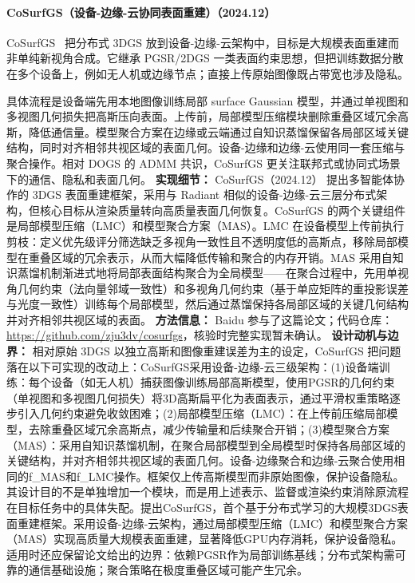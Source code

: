 \paragraph{CoSurfGS（设备-边缘-云协同表面重建）（2024.12）}
CoSurfGS~\cite{2412_17612} 把分布式 3DGS 放到设备-边缘-云架构中，目标是大规模表面重建而非单纯新视角合成。它继承 PGSR/2DGS 一类表面约束思想，但把训练数据分散在多个设备上，例如无人机或边缘节点；直接上传原始图像既占带宽也涉及隐私。

具体流程是设备端先用本地图像训练局部 surface Gaussian 模型，并通过单视图和多视图几何损失把高斯压向表面。上传前，局部模型压缩模块删除重叠区域冗余高斯，降低通信量。模型聚合方案在边缘或云端通过自知识蒸馏保留各局部区域关键结构，同时对齐相邻共视区域的表面几何。设备-边缘和边缘-云使用同一套压缩与聚合操作。相对 DOGS 的 ADMM 共识，CoSurfGS 更关注联邦式或协同式场景下的通信、隐私和表面几何。
\textbf{实现细节：} CoSurfGS（2024.12） 提出多智能体协作的 3DGS 表面重建框架，采用与 Radiant 相似的设备-边缘-云三层分布式架构，但核心目标从渲染质量转向高质量表面几何恢复。CoSurfGS 的两个关键组件是局部模型压缩（LMC）和模型聚合方案（MAS）。LMC 在设备模型上传前执行剪枝：定义优先级评分筛选缺乏多视角一致性且不透明度低的高斯点，移除局部模型在重叠区域的冗余表示，从而大幅降低传输和聚合的内存开销。MAS 采用自知识蒸馏机制渐进式地将局部表面结构聚合为全局模型——在聚合过程中，先用单视角几何约束（法向量邻域一致性）和多视角几何约束（基于单应矩阵的重投影误差与光度一致性）训练每个局部模型，然后通过蒸馏保持各局部区域的关键几何结构并对齐相邻共视区域的表面。
\textbf{方法信息：} Baidu 参与了这篇论文；代码仓库：\url{https://github.com/zju3dv/cosurfgs}，核验时完整实现暂未确认。
\textbf{设计动机与边界：} 相对原始 3DGS 以独立高斯和图像重建误差为主的设定，CoSurfGS 把问题落在以下可实现的改动上：CoSurfGS采用设备-边缘-云三级架构：(1)设备端训练：每个设备（如无人机）捕获图像训练局部高斯模型，使用PGSR的几何约束（单视图和多视图几何损失）将3D高斯扁平化为表面表示，通过平滑权重策略逐步引入几何约束避免收敛困难；(2)局部模型压缩（LMC）：在上传前压缩局部模型，去除重叠区域冗余高斯点，减少传输量和后续聚合开销；(3)模型聚合方案（MAS）：采用自知识蒸馏机制，在聚合局部模型到全局模型时保持各局部区域的关键结构，并对齐相邻共视区域的表面几何。设备-边缘聚合和边缘-云聚合使用相同的f\_MAS和f\_LMC操作。框架仅上传高斯模型而非原始图像，保护设备隐私。其设计目的不是单独增加一个模块，而是用上述表示、监督或渲染约束消除原流程在目标任务中的具体失配。提出CoSurfGS，首个基于分布式学习的大规模3DGS表面重建框架。采用设备-边缘-云架构，通过局部模型压缩（LMC）和模型聚合方案（MAS）实现高质量大规模表面重建，显著降低GPU内存消耗，保护设备隐私。适用时还应保留论文给出的边界：依赖PGSR作为局部训练基线；分布式架构需可靠的通信基础设施；聚合策略在极度重叠区域可能产生冗余。
